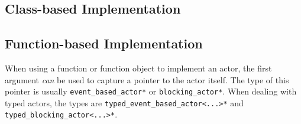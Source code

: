 \subsection{Class-based Implementation}

\subsection{Function-based Implementation}

When using a function or function object to implement an actor, the first argument \emph{can} be used to capture a pointer to the actor itself.
The type of this pointer is usually \lstinline^event_based_actor*^ or \lstinline^blocking_actor*^.
When dealing with typed actors, the types are \lstinline^typed_event_based_actor<...>*^ and \lstinline^typed_blocking_actor<...>*^.

